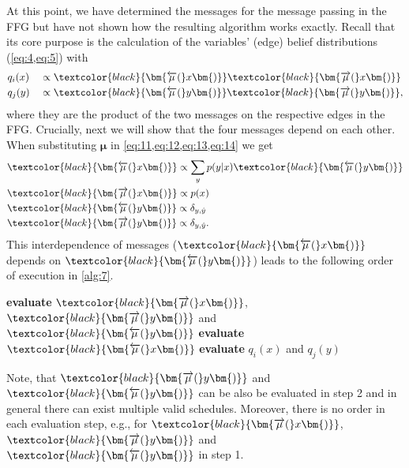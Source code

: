 At this point, we have determined the messages for the message passing in the FFG but have not shown how the resulting algorithm works exactly.
Recall that its core purpose is the calculation of the variables' (edge) belief distributions (\cref{eq:4,eq:5}) with
\begin{alignat}{2}
     & q_i(x) &  & \propto \textcolor{black}{\bm{\overleftarrow{\mu}(}x\bm{)}} \textcolor{black}{\bm{\overrightarrow{\mu}(}x\bm{)}}  \\
     & q_j(y) &  & \propto \textcolor{black}{\bm{\overleftarrow{\mu}(}y\bm{)}} \textcolor{black}{\bm{\overrightarrow{\mu}(}y\bm{)}},
\end{alignat}
where they are the product of the two messages on the respective edges in the FFG.
Crucially, next we will show that the four messages depend on each other. When substituting \(\bm{\mu}\) in \cref{eq:11,eq:12,eq:13,eq:14} we get
\begin{alignat}{2}
     & \textcolor{black}{\bm{\overleftarrow{\mu}(}x\bm{)}} \propto \sum_y p(y|x) \textcolor{black}{\bm{\overleftarrow{\mu}(}y\bm{)}} \\
     & \textcolor{black}{\bm{\overrightarrow{\mu}(}x\bm{)}} \propto p(x)                                                             \\
     & \textcolor{black}{\bm{\overleftarrow{\mu}(}y\bm{)}} \propto \delta_{y,\hat{y}}                                                \\
     & \textcolor{black}{\bm{\overrightarrow{\mu}(}y\bm{)}} \propto \delta_{y,\hat{y}}.
\end{alignat}
This interdependence of messages (\(\textcolor{black}{\bm{\overleftarrow{\mu}(}x\bm{)}}\) depends on \(\textcolor{black}{\bm{\overleftarrow{\mu}(}y\bm{)}}\)) leads to the following order of execution in \cref{alg:7}.
\begin{algorithm}[htbp]
    \caption{Message Passing Algorithm of the Model \(p(x,y)\)}
    \label{alg:7}
    \begin{algorithmic}[1]
        \State \textbf{evaluate} $\textcolor{black}{\bm{\overrightarrow{\mu}(}x\bm{)}}$, $\textcolor{black}{\bm{\overrightarrow{\mu}(}y\bm{)}}$ and $\textcolor{black}{\bm{\overleftarrow{\mu}(}y\bm{)}}$
        \State \textbf{evaluate} $\textcolor{black}{\bm{\overleftarrow{\mu}(}x\bm{)}}$
        \State \textbf{evaluate} $q_i(x)$ and $q_j(y)$
    \end{algorithmic}
\end{algorithm}
Note, that \(\textcolor{black}{\bm{\overrightarrow{\mu}(}y\bm{)}}\) and \(\textcolor{black}{\bm{\overleftarrow{\mu}(}y\bm{)}}\) can be also be evaluated in step 2 and in general there can exist multiple valid schedules. Moreover, there is no order in each evaluation step, e.g., for $\textcolor{black}{\bm{\overrightarrow{\mu}(}x\bm{)}}$, $\textcolor{black}{\bm{\overrightarrow{\mu}(}y\bm{)}}$ and $\textcolor{black}{\bm{\overleftarrow{\mu}(}y\bm{)}}$ in step 1.

